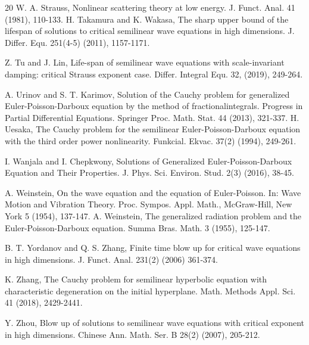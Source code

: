 \documentclass[review]{elsarticle}
\begin{document}
\begin{thebibliography}{20}
W. A. Strauss, Nonlinear scattering theory at low energy. J. Funct. Anal. 41 (1981), 110-133.
H. Takamura and K. Wakasa, The sharp upper bound of the lifespan of solutions to critical semilinear wave equations
in high dimensions. J. Differ. Equ. 251(4-5) (2011), 1157-1171.

Z. Tu and J. Lin, Life-span of semilinear wave equations with scale-invariant damping: critical Strauss exponent case.
Differ. Integral Equ. 32, (2019), 249-264.


A. Urinov and S. T. Karimov, Solution of the Cauchy problem for generalized Euler-Poisson-Darboux equation by the method of fractionalintegrals. Progress in Partial Differential Equations. Springer Proc. Math. Stat. 44 (2013), 321-337.
H. Uesaka, The Cauchy problem for the semilinear Euler-Poisson-Darboux equation with the third order power nonlinearity. Funkcial. Ekvac.  37(2) (1994), 249-261.





I. Wanjala and I. Chepkwony, Solutions of Generalized Euler-Poisson-Darboux Equation
and Their Properties. J. Phys. Sci. Environ. Stud. 2(3) (2016), 38-45.


A. Weinstein, On the wave equation and the equation of Euler-Poisson. In: Wave Motion and
Vibration Theory. Proc. Sympos. Appl. Math., McGraw-Hill, New York 5 (1954), 137-147.
A. Weinstein, The generalized radiation problem and the Euler-Poisson-Darboux equation. Summa Bras. Math. 3 (1955), 125-147.

B. T. Yordanov and Q. S. Zhang, Finite time blow up for critical wave equations in high dimensions. J. Funct. Anal.
231(2) (2006) 361-374.

K. Zhang, The Cauchy problem for semilinear hyperbolic equation with characteristic degeneration on the initial
hyperplane. Math. Methods Appl. Sci. 41 (2018), 2429-2441.


 Y. Zhou, Blow up of solutions to semilinear wave equations with critical exponent in high dimensions. Chinese Ann. Math. Ser. B 28(2) (2007), 205-212.
















\end{thebibliography}
\end{document}
